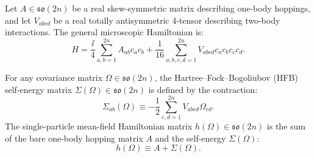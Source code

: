 \begin{definition}
\label{def:m1_1b_general_hamiltonian}
Let $A \in \mathfrak{so}(2n)$ be a real skew-symmetric matrix describing one-body hoppings, and let $V_{abcd}$ be a real totally antisymmetric 4-tensor describing two-body interactions. The general microscopic Hamiltonian is:
\begin{equation}
\label{eq:m1_1b_general_quartic_H}
H = \frac{\ii}{4}\sum_{a,b=1}^{2n} A_{ab} c_a c_b + \frac{1}{16}\sum_{a,b,c,d=1}^{2n} V_{abcd} c_a c_b c_c c_d.
\end{equation}
\end{definition}

\begin{definition}
\label{def:m1_1b_hfb_self_energy}
For any covariance matrix $\Omega \in \mathfrak{so}(2n)$, the Hartree--Fock--Bogoliubov (HFB) self-energy matrix $\Sigma(\Omega) \in \mathfrak{so}(2n)$ is defined by the contraction:
\begin{equation}
\label{eq:m1_1b_sigma_self_energy}
\Sigma_{ab}(\Omega) \equiv -\frac{1}{2} \sum_{c, d=1}^{2n} V_{abcd} \Omega_{cd}.
\end{equation}
The single-particle mean-field Hamiltonian matrix $h(\Omega) \in \mathfrak{so}(2n)$ is the sum of the bare one-body hopping matrix $A$ and the self-energy $\Sigma(\Omega)$:
\begin{equation}
\label{eq:m1_1b_h_omega_def}
h(\Omega) \equiv A + \Sigma(\Omega).
\end{equation}
\end{definition}

